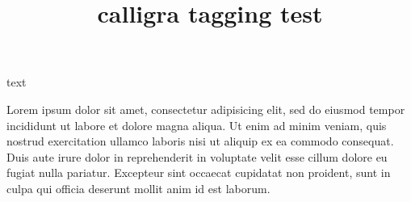 \documentclass{article}
\title{calligra tagging test}
\begin{document}
text

{\calligra Lorem ipsum dolor sit amet,
consectetur adipisicing elit, sed do
eiusmod tempor incididunt ut labore et
dolore magna aliqua. Ut enim ad minim
veniam, quis nostrud exercitation ullamco
laboris nisi ut aliquip ex ea commodo
consequat. Duis aute irure dolor in
reprehenderit in voluptate velit esse
cillum dolore eu fugiat nulla pariatur.
Excepteur sint occaecat cupidatat non
proident, sunt in culpa qui officia
deserunt mollit anim id est laborum.}

\end{document}

